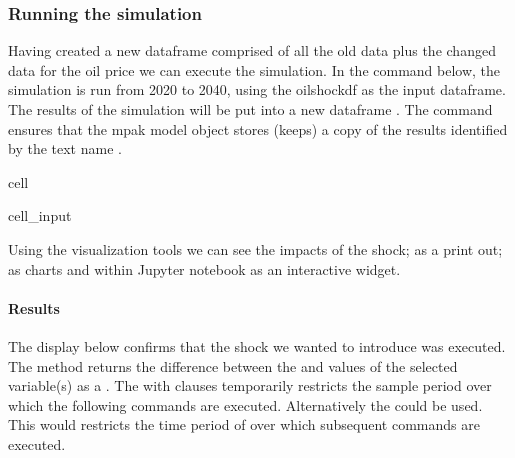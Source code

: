 \documentclass[letterpaper,10pt,english]{jupyterBook}
\begin{document}
\subsubsection{Running the simulation}
\label{\detokenize{content/06_WBModels/LoadingWBModel:running-the-simulation}}
\sphinxAtStartPar
Having created a new dataframe comprised of all the old data plus the changed data for the oil price we can execute the simulation.  In the command below, the simulation is run from 2020 to 2040, using the oilshockdf as the input dataframe.  The results of the simulation will be put into a new dataframe .  The  command ensures that the mpak model object stores (keeps) a copy of the results identified by the text name .

\begin{sphinxuseclass}{cell}\begin{sphinxVerbatimInput}

\begin{sphinxuseclass}{cell_input}
\begin{sphinxVerbatim}[commandchars=\\\{\}]
   
\end{sphinxVerbatim}

\end{sphinxuseclass}\end{sphinxVerbatimInput}

\end{sphinxuseclass}
\sphinxAtStartPar
Using the  visualization tools we can see the impacts of the shock; as a print out; as charts and within Jupyter notebook as an interactive widget.


\paragraph{Results}
\label{\detokenize{content/06_WBModels/LoadingWBModel:results}}
\sphinxAtStartPar
The display below confirms that the shock we wanted to introduce was executed. The  method returns the difference between the  and  values of the selected variable(s) as a . The with  clauses temporarily restricts the sample period over which the following  commands are executed.  Alternatively the could be used. This would restricts the time period of over which  subsequent commands are executed.
\end{document}
